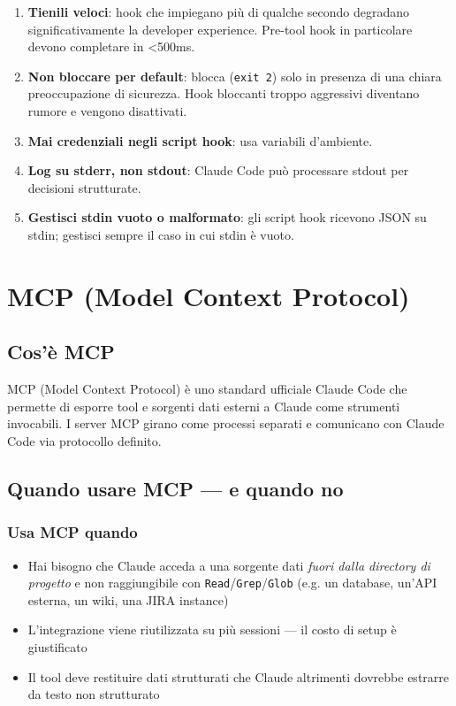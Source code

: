\documentclass[12pt,a4paper,twoside]{book}
\begin{document}
\begin{enumerate}
  \item \textbf{Tienili veloci}: hook che impiegano più di qualche secondo degradano significativamente la developer experience. Pre-tool hook in particolare devono completare in \textless 500ms.
  \item \textbf{Non bloccare per default}: blocca (\texttt{exit 2}) solo in presenza di una chiara preoccupazione di sicurezza. Hook bloccanti troppo aggressivi diventano rumore e vengono disattivati.
  \item \textbf{Mai credenziali negli script hook}: usa variabili d'ambiente.
  \item \textbf{Log su stderr, non stdout}: Claude Code può processare stdout per decisioni strutturate.
  \item \textbf{Gestisci stdin vuoto o malformato}: gli script hook ricevono JSON su stdin; gestisci sempre il caso in cui stdin è vuoto.
\end{enumerate}

\chapter{MCP (Model Context Protocol)}

\section{Cos'è MCP}

MCP (Model Context Protocol) è uno standard ufficiale Claude Code che permette di esporre tool e sorgenti dati esterni a Claude come strumenti invocabili. I server MCP girano come processi separati e comunicano con Claude Code via protocollo definito.

\section{Quando usare MCP — e quando no}

\subsection{Usa MCP quando}

\begin{itemize}
  \item Hai bisogno che Claude acceda a una sorgente dati \textit{fuori dalla directory di progetto} e non raggiungibile con \texttt{Read}/\texttt{Grep}/\texttt{Glob} (e.g. un database, un'API esterna, un wiki, una JIRA instance)
  \item L'integrazione viene riutilizzata su più sessioni — il costo di setup è giustificato
  \item Il tool deve restituire dati strutturati che Claude altrimenti dovrebbe estrarre da testo non strutturato
\end{itemize}
\end{document}
